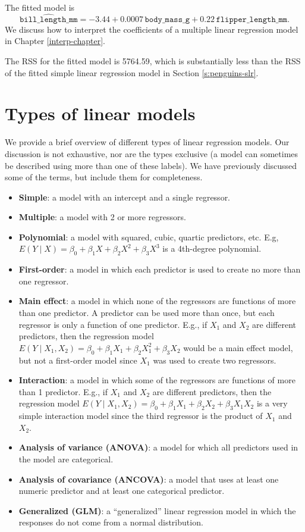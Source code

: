 \documentclass[
]{book}
\providecommand{\tightlist}{%
  \setlength{\itemsep}{0pt}\setlength{\parskip}{0pt}}
\theoremstyle{definition}
\theoremstyle{definition}
\theoremstyle{definition}
\theoremstyle{definition}
\theoremstyle{remark}
\begin{document}
The fitted model is
\[
\widehat{\mathtt{bill\_length\_mm}}=-3.44+0.0007 \,\mathtt{body\_mass\_g}+0.22\,\mathtt{flipper\_length\_mm}.
\]
We discuss how to interpret the coefficients of a multiple linear regression model in Chapter \ref{interp-chapter}.

The RSS for the fitted model is 5764.59, which is substantially less than the RSS of the fitted simple linear regression model in Section \ref{s:penguins-slr}.

\hypertarget{model-types}{%
\section{Types of linear models}\label{model-types}}

We provide a brief overview of different types of linear regression models. Our discussion is not exhaustive, nor are the types exclusive (a model can sometimes be described using more than one of these labels). We have previously discussed some of the terms, but include them for completeness.

\begin{itemize}
\tightlist
\item
  \textbf{Simple}: a model with an intercept and a single regressor.
\item
  \textbf{Multiple}: a model with 2 or more regressors.
\item
  \textbf{Polynomial}: a model with squared, cubic, quartic predictors, etc. E.g, \(E(Y\mid X) = \beta_0 + \beta_1 X + \beta_2 X^2 + \beta_3 X^3\) is a 4th-degree polynomial.
\item
  \textbf{First-order}: a model in which each predictor is used to create no more than one regressor.
\item
  \textbf{Main effect}: a model in which none of the regressors are functions of more than one predictor. A predictor can be used more than once, but each regressor is only a function of one predictor. E.g., if \(X_1\) and \(X_2\) are different predictors, then the regression model \(E(Y\mid X_1, X_2) = \beta_0 + \beta_1 X_1 + \beta_2 X_1^2 + \beta_3 X_2\) would be a main effect model, but not a first-order model since \(X_1\) was used to create two regressors.
\item
  \textbf{Interaction}: a model in which some of the regressors are functions of more than 1 predictor. E.g., if \(X_1\) and \(X_2\) are different predictors, then the regression model \(E(Y\mid X_1, X_2) = \beta_0 + \beta_1 X_1 + \beta_2 X_2 + \beta_3 X_1X_2\) is a very simple interaction model since the third regressor is the product of \(X_1\) and \(X_2\).
\item
  \textbf{Analysis of variance (ANOVA)}: a model for which all predictors used in the model are categorical.
\item
  \textbf{Analysis of covariance (ANCOVA)}: a model that uses at least one numeric predictor and at least one categorical predictor.
\item
  \textbf{Generalized (GLM)}: a ``generalized'' linear regression model in which the responses do not come from a normal distribution.
\end{itemize}
\end{document}
